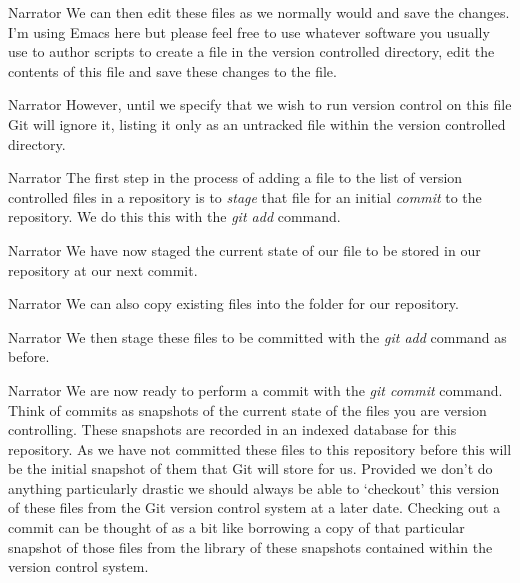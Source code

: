 \documentclass{screenplay} %
\begin{document}
\begin{dialogue}{Narrator}
We can then edit these files as we normally would and save the changes.  I'm using Emacs here but please feel free to use whatever software you usually use to author scripts to create a file in the version controlled directory, edit the contents of this file and save these changes to the file.
\end{dialogue}

\begin{dialogue}{Narrator}
However, until we specify that we wish to run version control on this file Git will ignore it, listing it only as an untracked file within the version controlled directory.
\end{dialogue}

\begin{dialogue}{Narrator}
The first step in the process of adding a file to the list of version controlled files in a repository is to \textit{stage} that file for an initial \textit{commit} to the repository.  We do this this with the \textit{git add} command.
\end{dialogue}

\begin{dialogue}{Narrator}
We have now staged the current state of our file to be stored in our repository at our next commit.
\end{dialogue}

\begin{dialogue}{Narrator}
We can also copy existing files into the folder for our repository.
\end{dialogue}

\begin{dialogue}{Narrator}
We then stage these files to be committed with the \textit{git add} command as before. 
\end{dialogue}

\begin{dialogue}{Narrator}
We are now ready to perform a commit with the \textit{git commit} command.  Think of commits as snapshots of the current state of the files you are version controlling. These snapshots are recorded in an indexed database for this repository. As we have not committed these files to this repository before this will be the initial snapshot of them that Git will store for us.  Provided we don't do anything particularly drastic we should always be able to `checkout' this version of these files from the Git version control system at a later date. Checking out a commit can be thought of as a bit like borrowing a copy of that particular snapshot of those files from the library of these snapshots contained within the version control system.
\end{dialogue}
\end{document}
